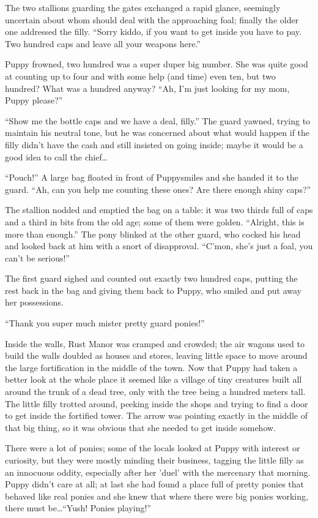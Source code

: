 The two stallions guarding the gates exchanged a rapid glance, seemingly uncertain about whom should deal with the approaching foal; finally the older one addressed the filly. ``Sorry kiddo, if you want to get inside you have to pay. Two hundred caps and leave all your weapons here.''

Puppy frowned, two hundred was a super duper big number. She was quite good at counting up to four and with some help (and time) even ten, but two hundred? What was a hundred anyway? ``Ah, I'm just looking for my mom, Puppy please?''

``Show me the bottle caps and we have a deal, filly.'' The guard yawned, trying to maintain his neutral tone, but he was concerned about what would happen if the filly didn't have the cash and still insisted on going inside; maybe it would be a good idea to call the chief\dots

``Pouch!'' A large bag floated in front of Puppysmiles and she handed it to the guard. ``Ah, can you help me counting these ones? Are there enough shiny caps?''

The stallion nodded and emptied the bag on a table: it was two thirds full of caps and a third in bits from the old age; some of them were golden. ``Alright, this is more than enough.'' The pony blinked at the other guard, who cocked his head and looked back at him with a snort of disapproval. ``C'mon, she's just a foal, you can't be serious!''

The first guard sighed and counted out exactly two hundred caps, putting the rest back in the bag and giving them back to Puppy, who smiled and put away her possessions.

``Thank you super much mister pretty guard ponies!''

Inside the walls, Rust Manor was cramped and crowded; the air wagons used to build the walls doubled as houses and stores, leaving little space to move around the large fortification in the middle of the town. Now that Puppy had taken a better look at the whole place it seemed like a village of tiny creatures built all around the trunk of a dead tree, only with the tree being a hundred meters tall. The little filly trotted around, peeking inside the shops and trying to find a door to get inside the fortified tower. The arrow was pointing exactly in the middle of that big thing, so it was obvious that she needed to get inside somehow.

There were a lot of ponies; some of the locals looked at Puppy with interest or curiosity, but they were mostly minding their business, tagging the little filly as an innocuous oddity, especially after her 'duel' with the mercenary that morning. Puppy didn't care at all; at last she had found a place full of pretty ponies that behaved like real ponies and she knew that where there were big ponies working, there must be\dots ``Yush! Ponies playing!''

